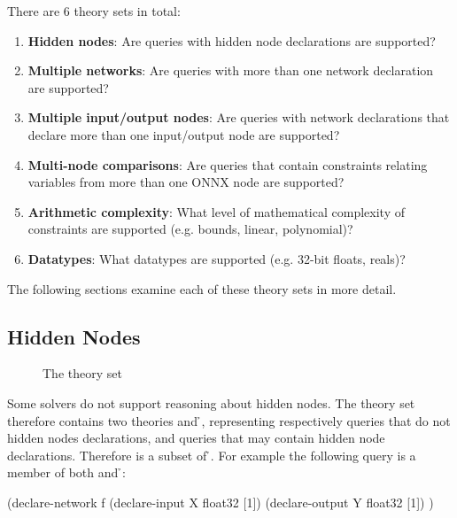 There are 6 theory sets in total:
\begin{enumerate}
\item \textbf{Hidden nodes}: Are queries with hidden node declarations  are supported?
\item \textbf{Multiple networks}: Are queries with more than one network declaration are supported?
\item \textbf{Multiple input/output nodes}: Are queries with network declarations that declare more than one input/output node  are supported?
\item \textbf{Multi-node comparisons}: Are queries that contain constraints relating variables from more than one ONNX node are supported?
\item \textbf{Arithmetic complexity}: What level of mathematical complexity of constraints are supported (e.g. bounds, linear, polynomial)?
\item \textbf{Datatypes}: What datatypes are supported (e.g. 32-bit floats, reals)?
\end{enumerate}
The following sections examine each of these theory sets in more detail.

\subsection{Hidden Nodes}
\label{sec:hidden-nodes}

\begin{figure}[h]
\centering
{}
\caption{The \hiddenNodes{} theory set}
\label{fig:hidden-nodes-theory-set}
\end{figure}

Some solvers do not support reasoning about hidden nodes. The \hiddenNodes{} theory set therefore contains two theories \nh{} and \h{}, representing respectively queries that do not hidden nodes declarations, and queries that may contain hidden node declarations. Therefore \nh{} is a subset of \h{}. For example the following query is a member of both \nh{} and \h{}:

\begin{code}[style=lbnf]
(declare-network f
    (declare-input  X float32 [1])
    (declare-output Y float32 [1])
)
\end{code}

